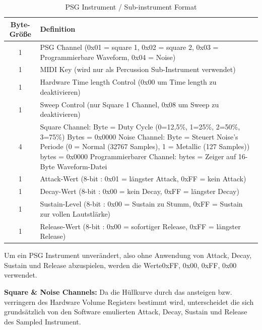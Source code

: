 \documentclass[11pt,a4paper]{scrartcl}
\begin{document}
\begin{table}[h]
    \centering
    \begin{tabular}{ c | p{15cm} }
        \textbf{Byte-Gr\"{o}{\ss}e} & \textbf{Definition} \\
				\hline
				1 & PSG Channel (0x01 = square 1, 0x02 = square 2, 0x03 = Programmierbare Waveform, 0x04 = Noise) \\
				\hline
        1 & MIDI Key (wird nur als Percussion Sub-Instrument verwendet)\\
				\hline
        1 & Hardware Time length Control (0x00 um Time length zu deaktivieren)\\
				\hline
        1 & Sweep Control (nur Square 1 Channel, 0x08 um Sweep zu deaktivieren) \\
				\hline
        4 & Square Channel:\newline
					1 Byte = Duty Cycle (0=12,5\%, 1=25\%, 2=50\%, 3=75\%)\newline
					3 Bytes = 0x0000\newline		
					Noise Channel:\newline	
					1 Byte = Steuert Noise's Periode (0 = Normal (32767 Samples), 1 = Metallic (127 Samples)) \newline
					3 bytes = 0x0000
					\newline
					Programmierbarer Channel:\newline
                4 bytes = Zeiger auf 16-Byte Waveform-Datei \\
				\hline
        1 & Attack-Wert (8-bit : 0x01 = l\"{a}ngster Attack, 0xFF = kein Attack)\\
				\hline
        1 & Decay-Wert (8-bit : 0x00 = kein Decay, 0xFF = l\"{a}ngster Decay) \\
				\hline
        1 & Sustain-Level (8-bit : 0x00 = Sustain zu Stumm, 0xFF = Sustain zur vollen Lautstl\"{a}rke) \\
				\hline
        1 & Release-Wert (8-bit : 0x00 = sofortiger Release, 0xFF = l\"{a}ngster Release) \\
				
    \end{tabular}
    \caption{PSG Instrument / Sub-instrument Format}
    \label{table:PSGInstrument}
\end{table}

Um ein PSG Instrument unver\"{a}ndert, also ohne Anwendung von Attack, Decay, Sustain und Release abzuspielen, werden die Werte0xFF, 0x00, 0xFF, 0x00 verwendet.

\textbf{Square \& Noise Channels:}\newline
Da die H\"{u}llkurve durch das ansteigen bzw. verringern des Hardware Volume Registers bestimmt wird, unterscheidet die sich grunds\"{a}tzlich von den  Software emulierten Attack, Decay, Sustain und Release des Sampled Instrument.
\end{document}
